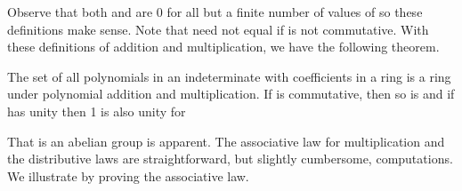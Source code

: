 \documentclass[11pt,oneside]{article}
\begin{document}
\begin{BookBody}
\noindent Observe that both  and  are 0 for all but a finite number of values of  so these definitions make sense. Note that  need not equal  if  is not commutative. With these definitions of addition and multiplication, we have the following theorem.

 The set  of all polynomials in an indeterminate  with coefficients in a ring  is a ring under polynomial addition and multiplication. If  is commutative, then so is  and if  has unity  then 1 is also unity for 

 That  is an abelian group is apparent. The associative law for multiplication and the distributive laws are straightforward, but slightly cumbersome, computations. We illustrate by proving the associative law.

\end{BookBody}

\BookNarrativetrue
\end{document}
